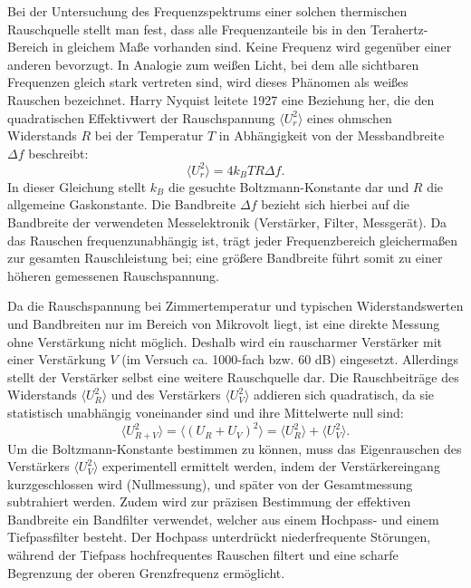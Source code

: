 Bei der Untersuchung des Frequenzspektrums einer solchen thermischen Rauschquelle stellt man fest, dass alle Frequenzanteile bis in den Terahertz-Bereich in gleichem Maße vorhanden sind. Keine Frequenz wird gegenüber einer anderen bevorzugt. In Analogie zum weißen Licht, bei dem alle sichtbaren Frequenzen gleich stark vertreten sind, wird dieses Phänomen als weißes Rauschen bezeichnet. Harry Nyquist leitete 1927 eine Beziehung her, die den quadratischen Effektivwert der Rauschspannung \(\langle U_r^2 \rangle\) eines ohmschen Widerstands \(R\) bei der Temperatur \(T\) in Abhängigkeit von der Messbandbreite \(\Delta f\) beschreibt:
\begin{equation} \label{eq:nyquist} 
    \langle U_r^2 \rangle = 4 k_B T R \Delta f .
\end{equation}
In dieser Gleichung stellt \(k_B\) die gesuchte Boltzmann-Konstante dar und \(R\) die allgemeine Gaskonstante. Die Bandbreite \(\Delta f\) bezieht sich hierbei auf die Bandbreite der verwendeten Messelektronik (Verstärker, Filter, Messgerät). Da das Rauschen frequenzunabhängig ist, trägt jeder Frequenzbereich gleichermaßen zur gesamten Rauschleistung bei; eine größere Bandbreite führt somit zu einer höheren gemessenen Rauschspannung.

Da die Rauschspannung bei Zimmertemperatur und typischen Widerstandswerten und Bandbreiten nur im Bereich von Mikrovolt liegt, ist eine direkte Messung ohne Verstärkung nicht möglich. Deshalb wird ein rauscharmer Verstärker mit einer Verstärkung \(V\) (im Versuch ca. 1000-fach bzw. 60 dB) eingesetzt. Allerdings stellt der Verstärker selbst eine weitere Rauschquelle dar. Die Rauschbeiträge des Widerstands \(\langle U_R^2 \rangle\) und des Verstärkers \(\langle U_V^2 \rangle\) addieren sich quadratisch, da sie statistisch unabhängig voneinander sind und ihre Mittelwerte null sind:
\begin{equation} \label{eq:total_noise} 
    \langle U_{R+V}^2 \rangle = \langle (U_R + U_V)^2 \rangle = \langle U_R^2 \rangle + \langle U_V^2 \rangle .
\end{equation}
Um die Boltzmann-Konstante bestimmen zu können, muss das Eigenrauschen des Verstärkers \(\langle U_V^2 \rangle\) experimentell ermittelt werden, indem der Verstärkereingang kurzgeschlossen wird (Nullmessung), und später von der Gesamtmessung subtrahiert werden. Zudem wird zur präzisen Bestimmung der effektiven Bandbreite ein Bandfilter verwendet, welcher aus einem Hochpass- und einem Tiefpassfilter besteht. Der Hochpass unterdrückt niederfrequente Störungen, während der Tiefpass hochfrequentes Rauschen filtert und eine scharfe Begrenzung der oberen Grenzfrequenz ermöglicht.

